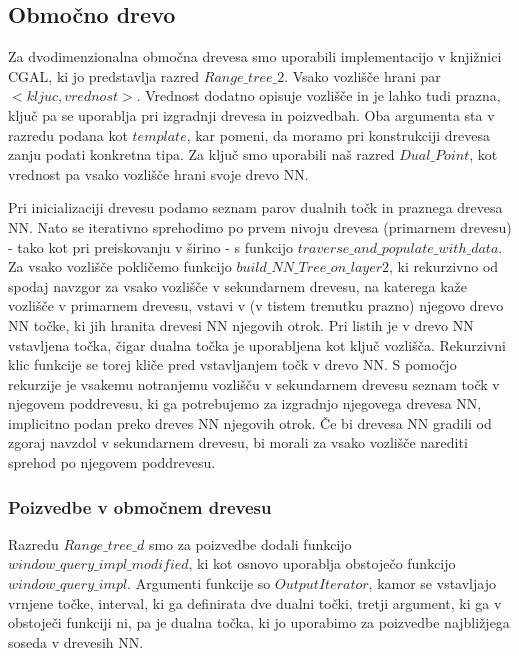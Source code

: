 \documentclass[a4paper, 12pt]{book}
\begin{document}
\subsection{Območno drevo}
Za dvodimenzionalna območna drevesa smo uporabili implementacijo v knjižnici CGAL, ki jo predstavlja razred $Range\texttt{\_}tree\texttt{\_}2$. Vsako vozlišče hrani par $<kljuc, vrednost>$. Vrednost dodatno opisuje vozlišče in je lahko tudi prazna, ključ pa se uporablja pri izgradnji drevesa in poizvedbah. Oba argumenta sta v razredu podana kot $template$, kar pomeni, da moramo pri konstrukciji drevesa zanju podati konkretna tipa. 
Za ključ smo uporabili naš razred $Dual\texttt{\_}Point$, kot vrednost pa vsako vozlišče hrani svoje drevo NN.

Pri inicializaciji drevesu podamo seznam parov dualnih točk in praznega drevesa NN. Nato se iterativno sprehodimo po prvem nivoju drevesa (primarnem drevesu) - tako kot pri preiskovanju v širino - s funkcijo $traverse\texttt{\_}and\texttt{\_}populate\texttt{\_}with\texttt{\_}data$. Za vsako vozlišče pokličemo funkcijo $build\texttt{\_}NN\texttt{\_}Tree\texttt{\_}on\texttt{\_}layer2$, ki rekurzivno  od spodaj navzgor za vsako vozlišče v sekundarnem drevesu, na katerega kaže vozlišče v primarnem drevesu, vstavi v (v tistem trenutku prazno) njegovo drevo NN točke, ki jih hranita drevesi NN njegovih otrok. Pri listih je v drevo NN vstavljena točka, čigar dualna točka je uporabljena kot ključ vozlišča. Rekurzivni klic funkcije se torej kliče pred vstavljanjem točk v drevo NN. S pomočjo rekurzije je vsakemu notranjemu vozlišču v sekundarnem drevesu seznam točk v njegovem poddrevesu, ki ga potrebujemo za izgradnjo njegovega drevesa NN, implicitno podan preko dreves NN njegovih otrok. Če bi drevesa NN gradili od zgoraj navzdol v sekundarnem drevesu, bi morali za vsako vozlišče narediti sprehod po njegovem poddrevesu.

\subsubsection{Poizvedbe v območnem drevesu}
Razredu $Range\texttt{\_}tree\texttt{\_}d$ smo za poizvedbe dodali funkcijo $window\texttt{\_}query\texttt{\_}impl\texttt{\_}modified$, ki  kot osnovo uporablja obstoječo funkcijo $window\texttt{\_}query\texttt{\_}impl$. Argumenti funkcije so $OutputIterator$, kamor se vstavljajo vrnjene točke, interval, ki ga definirata dve dualni točki, tretji argument, ki ga v obstoječi funkciji ni, pa je dualna točka, ki jo uporabimo za poizvedbe najbližjega soseda v drevesih NN. 
\end{document}
